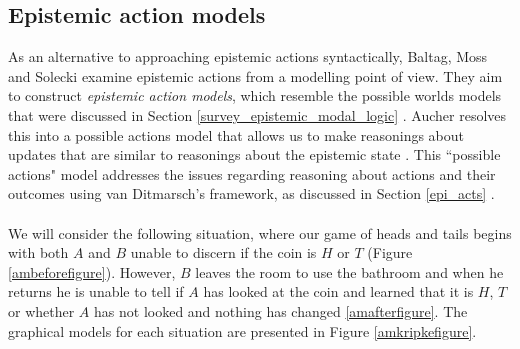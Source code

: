 \subsection{Epistemic action models} \label{act_mods}
As an alternative to approaching epistemic actions syntactically, Baltag, Moss
and Solecki examine epistemic actions from a modelling point of view.
They aim to construct {\em epistemic action models}, which resemble the possible 
worlds models that were discussed in Section \ref{survey_epistemic_modal_logic}
\cite{baltag1998lpa}.
Aucher resolves this into a possible actions model that allows us to make
reasonings about updates that are similar to reasonings about the epistemic
state \cite{aucher09revisited}.
This ``possible actions" model addresses the issues regarding reasoning about
actions and their outcomes using van Ditmarsch's framework, as discussed in
Section \ref{epi_acts} \cite{hoek2008dynamic}.\\
\\
We will consider the following situation, where our game of heads and tails
begins with both $A$ and $B$ unable to discern if the coin is $H$ or $T$ (Figure
\ref{ambeforefigure}).
However, $B$ leaves the room to use the bathroom and when he returns he is unable
to tell if $A$ has looked at the coin and learned that it is $H$, $T$ or whether
$A$ has not looked and nothing has changed \ref{amafterfigure}.
The graphical models for each situation are presented in Figure
\ref{amkripkefigure}.\\

